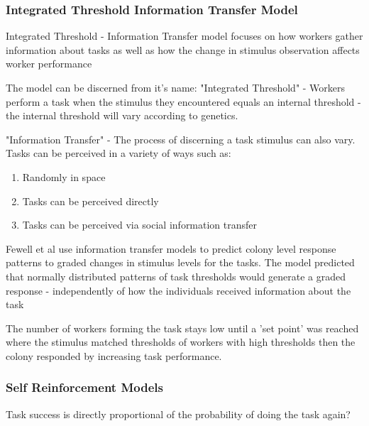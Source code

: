 



\subsubsection{Integrated Threshold Information Transfer Model}
Integrated Threshold - Information Transfer model \cite{fewell1999division} focuses on how workers gather information about tasks as well as how the change in stimulus observation affects worker performance %

The model can be discerned from it's name:
"Integrated Threshold" - Workers perform a task when the stimulus they encountered equals an internal threshold - the internal threshold will vary according to genetics. 

"Information Transfer" - The process of discerning a task stimulus can also vary.
Tasks can be perceived in a variety of ways such as:

\begin{enumerate}
	\item Randomly in space
	\item Tasks can be perceived directly
	\item Tasks can be perceived via social information transfer
\end{enumerate}

Fewell et al \cite{fewell1999division} use information transfer models to predict colony level response patterns to graded changes in stimulus levels for the tasks. The model predicted that normally distributed patterns of task thresholds would generate a graded response - independently of how the individuals received information about the task

The number of workers forming the task stays low until a 'set point' was reached where the stimulus matched thresholds of workers with high thresholds then the colony responded by increasing task performance.

\subsubsection{Self Reinforcement Models}
Task success is directly proportional of the probability of doing the task again?

